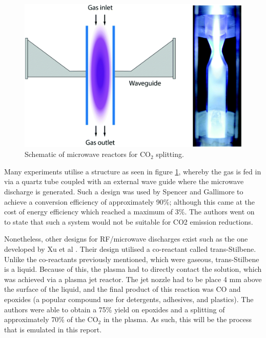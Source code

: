 \begin{figure}[h!]
	\centering
	\includegraphics[width=0.6\linewidth]{chapter_3/figures/mw_reactor.png}
	\caption{Schematic of microwave reactors for CO$_2$ splitting. \cite{Snoeckx2017}}
	\label{fig:mw_reactor}
\end{figure}

Many experiments utilise a structure as seen in figure \ref{fig:mw_reactor}, whereby the gas is fed in via a quartz tube coupled with an external wave guide where the microwave discharge is generated. Such a design was used by Spencer and Gallimore \cite{spencer_gallimore_2010} to achieve a conversion efficiency of approximately 90\%; although this came at the cost of energy efficiency which reached a maximum of 3\%. The authors went on to state that such a system would not be suitable for  CO2 emission reductions.

Nonetheless, other designs for RF/microwave discharges exist such as the one developed by Xu et al \cite{Xu2021}. Their design utilised a co-reactant called trans-Stilbene. Unlike the co-reactants previously mentioned, which were  gaseous, trans-Stilbene is a liquid. Because of this, the plasma had to directly contact the solution, which was achieved via a plasma jet reactor. The jet nozzle had to be place 4 mm above the surface of the liquid, and the final product of this reaction was CO and epoxides (a popular compound use for detergents, adhesives, and plastics). The authors were able to obtain a 75\% yield on epoxides and a splitting of approximately 70\% of the CO$_2$ in the plasma. As such, this will be the process that is emulated in this report.


